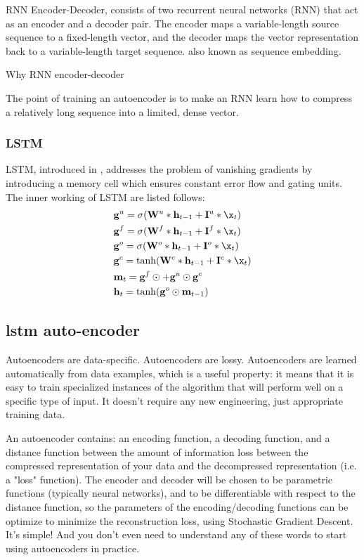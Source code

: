 \documentclass[review]{elsarticle}
\begin{document}
RNN Encoder-Decoder, consists of two recurrent neural networks (RNN) that act as an encoder and a decoder pair. The encoder maps a variable-length source sequence to a fixed-length vector, and the decoder maps the vector representation back to a variable-length target sequence. \cite{ChoLearningTranslation} also known as sequence embedding.

Why RNN encoder-decoder

The point of training an autoencoder is to make an RNN learn how to compress a relatively long sequence into a limited, dense vector.

\subsubsection{LSTM}
LSTM, introduced in \cite{Hochreiter1997LongMemory}, addresses the problem of vanishing gradients by introducing a memory cell which ensures constant error flow and gating units. The inner working of LSTM are listed follows:
\begin{equation}
	\begin{split}
		& \mathbf g^u = \sigma(\mathbf W^u * \mathbf h_{t-1} + \mathbf I^u * \x_t) \\
		& \mathbf g^f = \sigma(\mathbf W^f * \mathbf h_{t-1} + \mathbf I^f * \x_t) \\
		& \mathbf g^o = \sigma(\mathbf W^o * \mathbf h_{t-1} + \mathbf I^o * \x_t) \\
		& \mathbf g^c = \tanh(\mathbf W^c * \mathbf h_{t-1} + \mathbf I^c * \x_t) \\
		& \mathbf m_t = \mathbf g^f \odot \mathbf +  \mathbf g^u \odot \mathbf g^c \\
		& \mathbf h_t = \tanh(\mathbf g^o \odot \mathbf m_{t-1})
	\end{split}
\end{equation}


\subsection{lstm auto-encoder}
Autoencoders are data-specific. Autoencoders are lossy. Autoencoders are learned automatically from data examples, which is a useful property: it means that it is easy to train specialized instances of the algorithm that will perform well on a specific type of input. It doesn't require any new engineering, just appropriate training data. \cite{BuildingKeras}

An autoencoder contains: an encoding function, a decoding function, and a distance function between the amount of information loss between the compressed representation of your data and the decompressed representation (i.e. a "loss" function). The encoder and decoder will be chosen to be parametric functions (typically neural networks), and to be differentiable with respect to the distance function, so the parameters of the encoding/decoding functions can be optimize to minimize the reconstruction loss, using Stochastic Gradient Descent. It's simple! And you don't even need to understand any of these words to start using autoencoders in practice. \cite{BuildingKeras}
\end{document}
